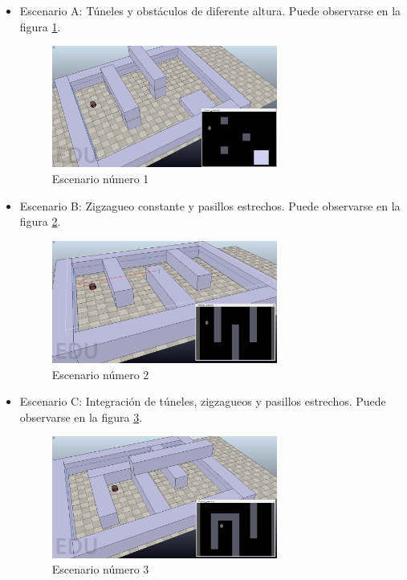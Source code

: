 \begin{itemize}
	\item Escenario A: Túneles y obstáculos de diferente altura. Puede observarse en la figura \ref{fig:escenario1}.	
	
	
\begin{figure}[H]
		\centering
        \includegraphics[width=0.7\textwidth]{images/escenario1}
        \caption{Escenario número 1}
        \label{fig:escenario1}
\end{figure} 
	
	\item Escenario B: Zigzagueo constante y pasillos estrechos. Puede observarse en la figura \ref{fig:escenario2}.
	
		
\begin{figure}[H]
		\centering
        \includegraphics[width=0.7\textwidth]{images/escenario2.png}
        \caption{Escenario número 2}
        \label{fig:escenario2}
\end{figure} 
	
	\item Escenario C: Integración de túneles, zigzagueos y pasillos estrechos. Puede observarse en la figura \ref{fig:escenario3}.

	
\begin{figure}[H]
		\centering
        \includegraphics[width=0.7\textwidth]{images/escenario3.png}
        \caption{Escenario número 3}
        \label{fig:escenario3}
\end{figure} 

\end{itemize}





